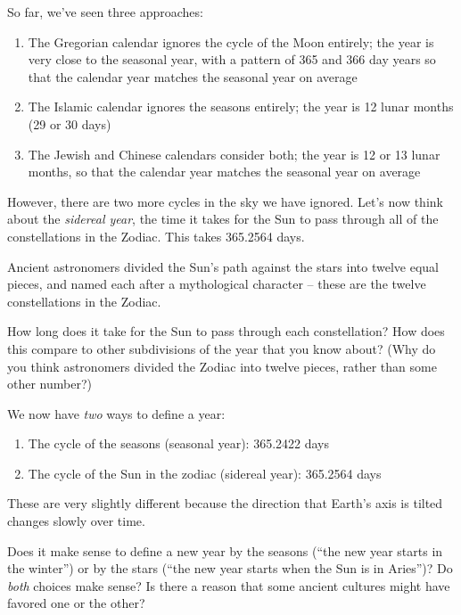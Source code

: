 \documentclass[11pt]{article}
\begin{document}
So far, we've seen three approaches:

\begin{enumerate}
	\item The Gregorian calendar ignores the cycle of the Moon entirely; the year is very close to the seasonal year, with a pattern of 365 and 366 day years so that the calendar year matches the seasonal year on average
	\item The Islamic calendar ignores the seasons entirely; the year is 12 lunar months (29 or 30 days)
	\item The Jewish and Chinese calendars consider both; the year is 12 or 13 lunar months, so that the calendar year matches the seasonal year on average
\end{enumerate}

However, there are two more cycles in the sky we have ignored. Let's now think about the {\it sidereal year}, the time it takes for the Sun to pass through all of the constellations in the Zodiac. This takes 365.2564 days.

Ancient astronomers divided the Sun's path against the stars into twelve equal pieces, and named each after a mythological character -- these are the twelve constellations in the Zodiac.

How long does it take for the Sun to pass through each constellation? How does this compare to other subdivisions of the year that you know about? (Why do you think astronomers divided the Zodiac into twelve pieces, rather than some other number?)

\vspace{2in}
\underline{\hspace{6in}}

We now have {\it two} ways to define a year: 

\begin{enumerate}
	\item The cycle of the seasons (seasonal year): 365.2422 days
	\item The cycle of the Sun in the zodiac (sidereal year): 365.2564 days
\end{enumerate}

These are very slightly different because the direction that Earth's axis is tilted changes slowly over time. 

Does it make sense to define a new year by the seasons (``the new year starts in the winter'') or by the stars (``the new year starts when the Sun is in Aries'')? Do {\it both} choices make sense? Is there a reason that some ancient cultures might have favored one or the other?

\underline{\hspace{6in}}

\vspace{2in}
\end{document}
